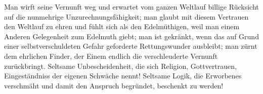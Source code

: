 Man wirft seine Vernunft weg und erwartet vom ganzen Weltlauf billige Rücksicht auf die nunmehrige Unzurechnungsfähigkeit; man glaubt mit diesem Vertrauen den Weltlauf zu ehren und fühlt sich als den Edelmüthigen, weil man einem Anderen Gelegenheit zum Edelmuth giebt; man ist gekränkt, wenn das auf Grund einer selbstverschuldeten Gefahr geforderte Rettungswunder ausbleibt; man zürnt dem ehrlichen Finder, der Einem endlich die verschleuderte Vernunft zurückbringt. Seltsame Unbescheidenheit, die sich Religion, Gottvertrauen, Eingeständniss der eigenen Schwäche nennt! Seltsame Logik, die Erworbenes verschmäht und damit den Anspruch begründet, beschenkt zu werden!
\par

